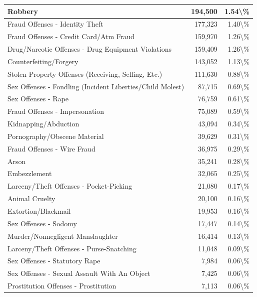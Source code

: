 \documentclass[
]{krantz}
\begin{document}
\begin{longtable}[t]{l|r|r}
\hline
Robbery & 194,500 & 1.54\textbackslash{}\%\\
\hline
Fraud Offenses - Identity Theft & 177,323 & 1.40\textbackslash{}\%\\
\hline
Fraud Offenses - Credit Card/Atm Fraud & 159,970 & 1.26\textbackslash{}\%\\
\hline
Drug/Narcotic Offenses - Drug Equipment Violations & 159,409 & 1.26\textbackslash{}\%\\
\hline
Counterfeiting/Forgery & 143,052 & 1.13\textbackslash{}\%\\
\hline
Stolen Property Offenses (Receiving, Selling, Etc.) & 111,630 & 0.88\textbackslash{}\%\\
\hline
Sex Offenses - Fondling (Incident Liberties/Child Molest) & 87,715 & 0.69\textbackslash{}\%\\
\hline
Sex Offenses - Rape & 76,759 & 0.61\textbackslash{}\%\\
\hline
Fraud Offenses - Impersonation & 75,089 & 0.59\textbackslash{}\%\\
\hline
Kidnapping/Abduction & 43,094 & 0.34\textbackslash{}\%\\
\hline
Pornography/Obscene Material & 39,629 & 0.31\textbackslash{}\%\\
\hline
Fraud Offenses - Wire Fraud & 36,975 & 0.29\textbackslash{}\%\\
\hline
Arson & 35,241 & 0.28\textbackslash{}\%\\
\hline
Embezzlement & 32,065 & 0.25\textbackslash{}\%\\
\hline
Larceny/Theft Offenses - Pocket-Picking & 21,080 & 0.17\textbackslash{}\%\\
\hline
Animal Cruelty & 20,100 & 0.16\textbackslash{}\%\\
\hline
Extortion/Blackmail & 19,953 & 0.16\textbackslash{}\%\\
\hline
Sex Offenses - Sodomy & 17,447 & 0.14\textbackslash{}\%\\
\hline
Murder/Nonnegligent Manslaughter & 16,414 & 0.13\textbackslash{}\%\\
\hline
Larceny/Theft Offenses - Purse-Snatching & 11,048 & 0.09\textbackslash{}\%\\
\hline
Sex Offenses - Statutory Rape & 7,984 & 0.06\textbackslash{}\%\\
\hline
Sex Offenses - Sexual Assault With An Object & 7,425 & 0.06\textbackslash{}\%\\
\hline
Prostitution Offenses - Prostitution & 7,113 & 0.06\textbackslash{}\%\\

\end{longtable}
\end{document}
